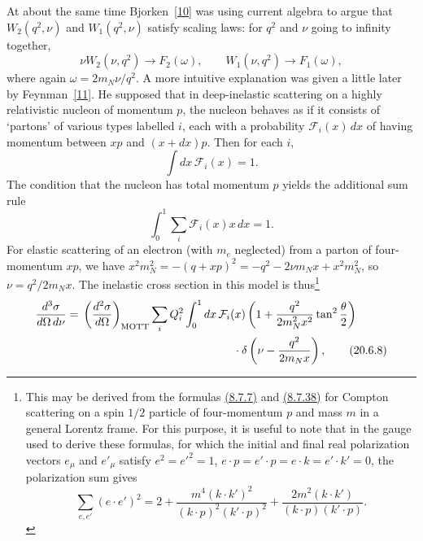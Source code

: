At about the same time Bjorken~\hyperref[ch20-ref-10]{[10]} was using current algebra to argue that $W_2(q^2,\nu)$ and $W_1(q^2,\nu)$ satisfy scaling laws: for $q^2$ and $\nu$ going to infinity together,
\begin{equation}
\nu W_2(\nu,q^2)\longrightarrow F_2(\omega),
\qquad
W_1(\nu,q^2)\longrightarrow F_1(\omega),
\tag{20.6.5}\label{eq:20.6.5}
\end{equation}
where again $\omega=2m_N\nu/q^2$. A more intuitive explanation was given a little later by Feynman~\hyperref[ch20-ref-11]{[11]}. He supposed that in deep-inelastic scattering on a highly relativistic nucleon of momentum $p$, the nucleon behaves as if it consists of `partons' of various types labelled $i$, each with a probability $\mathcal F_i(x)\,dx$ of having momentum between $xp$ and $(x+dx)p$. Then for each $i$,
\begin{equation}
\int dx\,\mathcal F_i(x)=1.
\tag{20.6.6}\label{eq:20.6.6}
\end{equation}
The condition that the nucleon has total momentum $p$ yields the additional sum rule
\begin{equation}
\int_0^1\sum_i\mathcal F_i(x)x\,dx=1.
\tag{20.6.7}\label{eq:20.6.7}
\end{equation}
For elastic scattering of an electron (with $m_e$ neglected) from a parton of four-momentum $xp$, we have $x^2m_N^2=-(q+xp)^2=-q^2-2\nu m_Nx+x^2m_N^2$, so $\nu=q^2/2m_Nx$. The inelastic cross section in this model is thus\footnote{This may be derived from the formulas \hyperref[eq:8.7.7]{(8.7.7)} and \hyperref[eq:8.7.38]{(8.7.38)} for Compton scattering on a spin $1/2$ particle of four-momentum $p$ and mass $m$ in a general Lorentz frame. For this purpose, it is useful to note that in the gauge used to derive these formulas, for which the initial and final real polarization vectors $e_\mu$ and $e'_\mu$ satisfy $e^2=e'^2=1$, $e\cdot p=e'\cdot p=e\cdot k=e'\cdot k'=0$, the polarization sum gives
\[
\sum_{e,e'}(e\cdot e')^2
=2+\frac{m^4(k\cdot k')^2}{(k\cdot p)^2(k'\cdot p)^2}
+\frac{2m^2(k\cdot k')}{(k\cdot p)(k'\cdot p)}.
\]}
\begin{align}
\frac{d^3\sigma}{d\Omega\,d\nu}
={}&
\left(\frac{d^2\sigma}{d\Omega}\right)_{\mathrm{MOTT}}
\sum_iQ_i^2\int_0^1dx\,\mathcal F_i(x)
\left(1+\frac{q^2}{2m_N^2x^2}\tan^2\frac{\theta}{2}\right)
\notag\\
&\hspace{47mm}\cdot
\delta\left(\nu-\frac{q^2}{2m_Nx}\right),
\tag{20.6.8}\label{eq:20.6.8}
\end{align}
